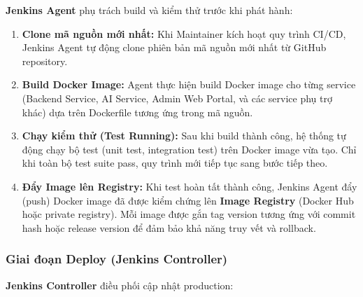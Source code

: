 \textbf{Jenkins Agent} phụ trách build và kiểm thử trước khi phát hành:

\begin{enumerate}
    \item \textbf{Clone mã nguồn mới nhất:} Khi Maintainer kích hoạt quy trình CI/CD, Jenkins Agent tự động clone phiên bản mã nguồn mới nhất từ GitHub repository.
    
    \item \textbf{Build Docker Image:} Agent thực hiện build Docker image cho từng service (Backend Service, AI Service, Admin Web Portal, và các service phụ trợ khác) dựa trên Dockerfile tương ứng trong mã nguồn.
    
    \item \textbf{Chạy kiểm thử (Test Running):} Sau khi build thành công, hệ thống tự động chạy bộ test (unit test, integration test) trên Docker image vừa tạo. Chỉ khi toàn bộ test suite pass, quy trình mới tiếp tục sang bước tiếp theo.
    
    \item \textbf{Đẩy Image lên Registry:} Khi test hoàn tất thành công, Jenkins Agent đẩy (push) Docker image đã được kiểm chứng lên \textbf{Image Registry} (Docker Hub hoặc private registry). Mỗi image được gắn tag version tương ứng với commit hash hoặc release version để đảm bảo khả năng truy vết và rollback.
\end{enumerate}

\subsubsection{Giai đoạn Deploy (Jenkins Controller)}

\textbf{Jenkins Controller} điều phối cập nhật production:

